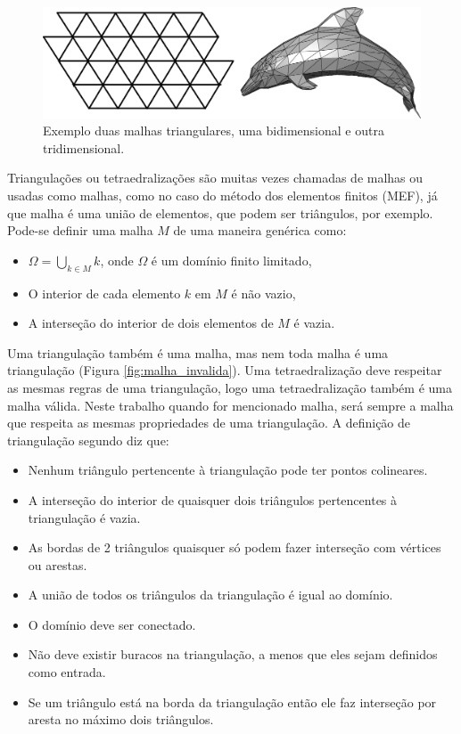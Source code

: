  \begin{figure}[htbp]
 	\centering
 	\includegraphics[width=1.0\textwidth]{fig/malha_bi_tri.png}
 	\caption{Exemplo duas malhas triangulares, uma bidimensional e outra tridimensional.} 
 	\label{fig:malhas_triangulares}
 \end{figure}

Triangulações ou tetraedralizações são muitas vezes chamadas de malhas ou usadas como malhas, como no caso do método dos elementos finitos (MEF), já que malha é uma união de elementos, que podem ser triângulos, por exemplo. Pode-se definir uma malha $M$ de uma maneira genérica como:

\begin{itemize}
 \item $\varOmega = \bigcup\limits_{k \in M} k $, onde $\varOmega$ é um domínio finito limitado,
 \item O interior de cada elemento $k$ em $M$ é não vazio,
 \item A interseção do interior de dois elementos de $M$ é vazia.
\end{itemize}


Uma triangulação também é uma malha, mas nem toda malha é uma triangulação (Figura \ref{fig:malha_invalida}). Uma tetraedralização deve respeitar as mesmas regras de uma triangulação, logo uma tetraedralização também é uma malha válida. Neste trabalho quando for mencionado malha, será sempre a malha que respeita as mesmas propriedades de uma triangulação. A definição de triangulação segundo \cite{bib:Triangulations_applications} diz que:

\begin{itemize}
  \item Nenhum triângulo pertencente à triangulação pode ter pontos colineares.
  \item A interseção do interior de quaisquer dois triângulos pertencentes à triangulação é vazia.
  \item As bordas de 2 triângulos quaisquer só podem fazer interseção com vértices ou arestas.
  \item A união de todos os triângulos da triangulação é igual ao domínio.  
  \item O domínio deve ser conectado.
  \item Não deve existir buracos na triangulação, a menos que eles sejam definidos como entrada.
  \item Se um triângulo está na borda da triangulação então ele faz interseção por aresta no máximo dois triângulos.
\end{itemize}


